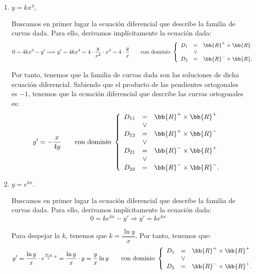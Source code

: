 \begin{ejercicio}
\begin{enumerate}
        \item\label{itm:ej1.4_b} \(y = kx^4\),
        
        Buscamos en primer lugar la ecuación diferencial que describe la familia de curvas dada. Para ello, derivamos implícitamente la ecuación dada:
        \begin{equation*}
            0 = 4kx^3 - y' \Longrightarrow y' = 4kx^3 = 4\cdot \dfrac{y}{x^4} \cdot x^3 = 4\cdot \dfrac{y}{x} \qquad \text{con dominio } \left\{\begin{array}{rcl}
                D_1&=&\bb{R}^+\times \bb{R}\\
                &\lor& \\
                D_2&=&\bb{R}^-\times \bb{R}.
            \end{array}\right.
        \end{equation*}

        Por tanto, tenemos que la familia de curvas dada son las soluciones de dicha ecuación diferencial.
        Sabiendo que el producto de las pendientes ortogonales es $-1$, tenemos que la ecuación diferencial que describe las curvas ortogonales es:
        \begin{equation*}
            y' = -\dfrac{x}{4y} \qquad \text{con dominio } \left\{\begin{array}{rcl}
                D_{11}&=&\bb{R}^+\times \bb{R}^+\\
                &\lor& \\
                D_{12}&=&\bb{R}^+\times \bb{R}^-\\
                &\lor& \\
                D_{21}&=&\bb{R}^-\times \bb{R}^+\\
                &\lor& \\
                D_{22}&=&\bb{R}^-\times \bb{R}^-.
            \end{array}\right.
        \end{equation*}
        \item\label{itm:ej1.4_c} \(y = e^{kx}\).
        
        Buscamos en primer lugar la ecuación diferencial que describe la familia de curvas dada. Para ello, derivamos implícitamente la ecuación dada:
        \begin{equation*}
            0 = ke^{kx} - y' \Longrightarrow y' = ke^{kx}
        \end{equation*}

        Para despejar la $k$, tenemos que $k = \dfrac{\ln y}{x}$. Por tanto, tenemos que:
        \begin{equation*}
            y' = \dfrac{\ln y}{x}\cdot e^{\frac{\ln y}{x}\cdot x} = \dfrac{\ln y}{x}\cdot y = \dfrac{y}{x}\ln y \qquad \text{con dominio } \left\{\begin{array}{rcl}
                D_1&=&\bb{R}^+\times \bb{R}^+\\
                &\lor& \\
                D_2&=&\bb{R}^- \times \bb{R}^+.
            \end{array}\right.
        \end{equation*}


\end{enumerate}
\end{ejercicio}

